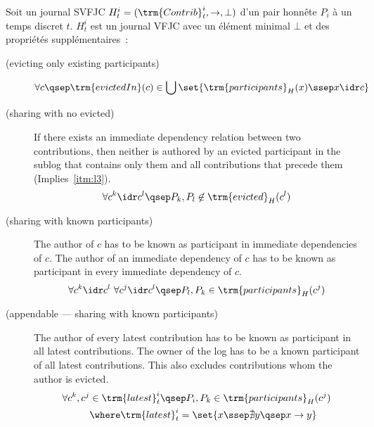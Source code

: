 \begin{definition}\label{def:svfjc-log}
Soit un journal \ac{SVFJC} $H^i_t = (\trm{Contrib}^i_t, \to, \bot)$ d'un pair honnête $P_i$ à un temps discret $t$.
$H^i_t$ est un journal \ac{VFJC} avec un élément minimal $\bot$ et des propriétés supplémentaires~:

  \begin{description}
  \item[ (evicting only existing participants)]
  \begin{equation*}
  \forall c \qsep \trm{evictedIn}(c) \in \bigcup \set{\trm{participants}_H(x) \ssep x \idr c}
  \end{equation*}

  \item[ (sharing with no evicted)]
  If there exists an immediate dependency relation between two contributions, then neither is authored by an evicted participant in the sublog that contains only them and all contributions that precede them (Implies~\ref{itm:l3}).
  \begin{equation*}
  \forall c^k \idr c^l \qsep P_k, P_l \not\in \trm{evicted}_H(c^l)
  \end{equation*}

  \item[ (sharing with known participants)]
  The author of $c$ has to be known as participant in immediate dependencies of $c$. The author of an immediate dependency of $c$ has to be known as participant in every immediate dependency of $c$.
  \begin{equation*}
  \forall c^k \idr c^l \ \forall c^j \idr c^l \qsep P_l, P_k \in \trm{participants}_H(c^j)
  \end{equation*}

    \item[ (appendable --- sharing with known participants)]
    The author of every latest contribution has to be known as participant in all latest contributions. The owner of the log has to be a known participant of all latest contributions. This also excludes contributions whom the author is evicted.
  \begin{align*}
  \forall c^k, c^j &\in \trm{latest}^i_t \qsep P_i, P_k \in \trm{participants}_H(c^j)\\
  &\where \trm{latest}^i_t = \set{x \ssep \nexists y \qsep x \to y}
  \end{align*}
  \end{description}
\end{definition}

